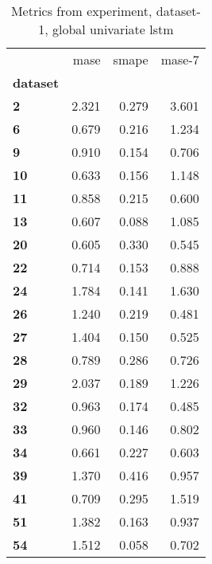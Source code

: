 \begin{table}[h]
\centering
\caption{Metrics from experiment, dataset-1, global univariate lstm}
\label{table:global-univariate-lstm-dataset-1}
\begin{tabular}{lrrr}
\toprule
{} &   mase &  smape &  mase-7 \\
\textbf{dataset} &        &        &         \\
\midrule
\textbf{2      } &  2.321 &  0.279 &   3.601 \\
\textbf{6      } &  0.679 &  0.216 &   1.234 \\
\textbf{9      } &  0.910 &  0.154 &   0.706 \\
\textbf{10     } &  0.633 &  0.156 &   1.148 \\
\textbf{11     } &  0.858 &  0.215 &   0.600 \\
\textbf{13     } &  0.607 &  0.088 &   1.085 \\
\textbf{20     } &  0.605 &  0.330 &   0.545 \\
\textbf{22     } &  0.714 &  0.153 &   0.888 \\
\textbf{24     } &  1.784 &  0.141 &   1.630 \\
\textbf{26     } &  1.240 &  0.219 &   0.481 \\
\textbf{27     } &  1.404 &  0.150 &   0.525 \\
\textbf{28     } &  0.789 &  0.286 &   0.726 \\
\textbf{29     } &  2.037 &  0.189 &   1.226 \\
\textbf{32     } &  0.963 &  0.174 &   0.485 \\
\textbf{33     } &  0.960 &  0.146 &   0.802 \\
\textbf{34     } &  0.661 &  0.227 &   0.603 \\
\textbf{39     } &  1.370 &  0.416 &   0.957 \\
\textbf{41     } &  0.709 &  0.295 &   1.519 \\
\textbf{51     } &  1.382 &  0.163 &   0.937 \\
\textbf{54     } &  1.512 &  0.058 &   0.702 \\
\bottomrule
\end{tabular}
\end{table}
